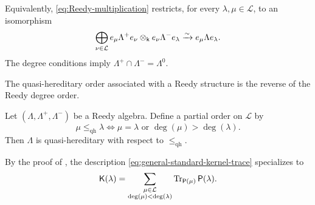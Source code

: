 Equivalently, \eqref{eq:Reedy-multiplication} restricts, for every
$\lambda,\mu\in\mathcal L$, to an isomorphism
\begin{equation}
\bigoplus_{\nu\in\mathcal L}
e_\mu\Lambda^+e_\nu
\otimes_{\mathsf{k}}
e_\nu\Lambda^-e_\lambda
\xrightarrow{\sim}
e_\mu\Lambda e_\lambda.
\label{eq:Reedy-blockwise-multiplication}
\end{equation}
The degree conditions imply
$\Lambda^+\cap\Lambda^-=\Lambda^0$.

The quasi-hereditary order associated with a Reedy structure is the
reverse of the Reedy degree order. 

\begin{proposition}[{\cite[Theorem~4.22]{DS}}]
\label{prop:Reedy-QH}
Let $(\Lambda,\Lambda^+,\Lambda^-)$ be a Reedy algebra. Define a partial
order on $\mathcal L$ by
\begin{equation}
\mu\leq_{\mathrm{qh}}\lambda
\Longleftrightarrow
\mu=\lambda
\text{ or }
\deg(\mu)>\deg(\lambda).
\label{eq:Reedy-QH-order}
\end{equation}
Then $\Lambda$ is quasi-hereditary with respect to
$\leq_{\mathrm{qh}}$.
\end{proposition}


By the proof of \cite[Theorem~4.22]{DS}, the description 
\eqref{eq:general-standard-kernel-trace} specializes to 
\begin{equation}
\mathsf K(\lambda)
=
\sum_{\substack{\mu\in\mathcal L\\
\deg(\mu)<\deg(\lambda)}}
\operatorname{Tr}_{\mathsf P(\mu)}\mathsf P(\lambda).
\label{eq:Reedy-standard-kernel}
\end{equation}

